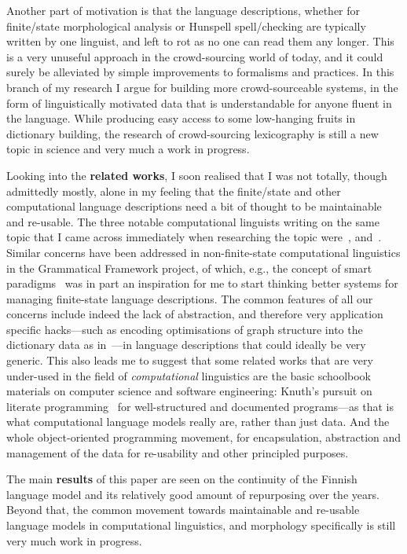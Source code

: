 \documentclass[officiallayout]{unihelcompling}
\begin{document}
Another part of motivation is that the language descriptions, whether for
finite\-/state morphological analysis or Hunspell spell\-/checking are typically
written by one linguist, and left to rot as no one can read them any longer.
This is a very unuseful approach in the crowd-sourcing world of today, and it
could surely be alleviated by simple improvements to formalisms and practices.
In this branch of my research I argue for building more crowd-sourceable
systems, in the form of linguistically motivated data that is understandable
for anyone fluent in the language. While producing easy access to some
low-hanging fruits in dictionary building, the research of crowd-sourcing
lexicography is still a new topic in science and very much a work in progress.


Looking into the \textbf{related works}, I soon realised that I was not
totally, though admittedly mostly, alone in my feeling that the finite\-/state
and other computational language descriptions need a bit of thought to be
maintainable and re-usable. The three notable computational linguists writing
on the same topic that I came across immediately when researching the topic
were~\citet{maxwell2008joint}, and~\citet{wintner2008strengths}. Similar
concerns have been addressed in non-finite-state computational linguistics in
the Grammatical Framework project, of which, e.g., the concept of smart
paradigms~\citep{ranta2008predictable} was in part an inspiration for me to
start thinking better systems for managing finite-state language descriptions.
The common features of all our concerns include indeed the lack of abstraction,
and therefore very application specific hacks---such as encoding optimisations
of graph structure into the dictionary data as
in~\citep{karttunen2006numbers}---in language descriptions that could ideally
be very generic. This also leads me to suggest that some related works that are
very under-used in the field of \emph{computational} linguistics are the basic
schoolbook materials on computer science and software engineering: Knuth's
pursuit on literate programming~\citep{knuth1984literate} for well-structured
and documented programs---as that is what computational language models really
are, rather than just data. And the whole object-oriented programming movement,
for encapsulation, abstraction and management of the data for re-usability and
other principled purposes.

The main \textbf{results} of this paper are seen on the continuity of the
Finnish language model and its relatively good amount of repurposing over the
years.  Beyond that, the common movement towards maintainable and re-usable
language models in computational linguistics, and morphology specifically is
still very much work in progress.
\end{document}
